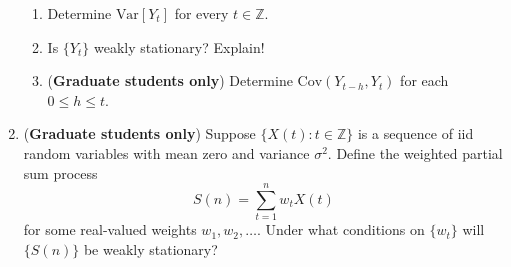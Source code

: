 \documentclass[10pt, letterpaper]{scrartcl}
\newcommand{\Z}{\mathbb{Z}}
\newcommand{\integers}{\mathbb{Z}}
\newcommand{\cov}{\text{Cov}}
\newcommand{\var}{\text{Var}}
\begin{document}
\begin{enumerate}[align=left, leftmargin=*, label=\sffamily\bfseries Problem \arabic*:]
\begin{enumerate}
\item Determine $\var[Y_t]$ for every $t\in \Z$.

\item Is $\{Y_t\}$ weakly stationary? Explain!


\item (\textbf{\sffamily Graduate students only}) Determine $\cov(Y_{t-h},Y_t)$ for each $0\le h\le t$.


\end{enumerate}




\item  (\textbf{\sffamily Graduate students only})
Suppose $\{X(t):t\in\integers\}$ is a sequence of iid random variables with 
mean zero and variance $\sigma^2$.  Define the weighted partial sum process 
\[
  S(n) = \sum_{t=1}^n w_t X(t)
\]
for some real-valued weights $w_1,w_2,\ldots$.  Under what conditions 
on $\{w_t\}$ will $\{S(n)\}$ be weakly stationary?



\end{enumerate}
\end{document}
